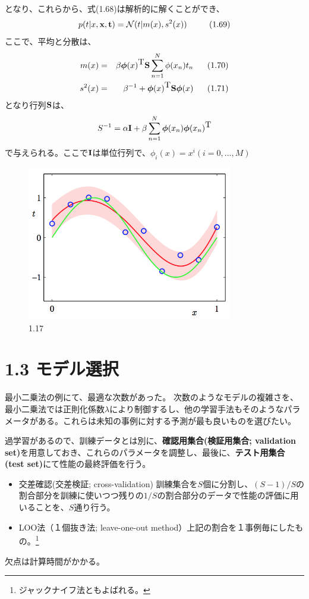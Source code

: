 \documentclass{jsarticle}
\def\N{{\mathcal{N}}}
\def\p{{\bm{\phi}}}
\def\t{{\mbox{\bf t}}}
\def\x{{\mbox{\bf x}}}
\def\T{{\mbox{T}}}
\def\S{{\mbox{\bf S}}}
\def\I{{\mbox{\bf I}}}
\begin{document}
となり、これらから、式(1.68)は解析的に解くことができ、
\[
p(t|x,\x,\t) = \N(t|m(x),s^2(x))  \ \ \ \ \ \ \ \ (1.69)
\]
ここで、平均と分散は、
\begin{eqnarray*}
  m(x) & = &\beta\p(x)^{\T}\S\sum_{n=1}^{N}\phi(x_n)t_n \ \ \ \ \ (1.70) \\
  s^2(x) & = & \beta^{-1} + \p(x)^{\T}\S\p(x) \ \ \ \ \ (1.71)
\end{eqnarray*}
となり行列$\S$は、
\begin{eqnarray*}
  S^{-1} = \alpha\I+\beta\sum_{n=1}^{N}\p(x_n)\p(x_n)^\T
\end{eqnarray*}
で与えられる。ここで$\I$は単位行列で、$\phi_i(x) = x^i (i=0,...,M)$

\begin{figure}
  \centering
  \includegraphics[width=0.8\textwidth]{f1-17.png}
  \caption{1.17}
\end{figure}

\section*{1.3 モデル選択}

最小二乗法の例にて、最適な次数があった。
次数のようなモデルの複雑さを、最小二乗法では正則化係数$\lambda$により制御するし、他の学習手法もそのようなパラメータがある。これらは未知の事例に対する予測が最も良いものを選びたい。

過学習があるので、訓練データとは別に、{\bf 確認用集合(検証用集合; validation set)}を用意しておき、これらのパラメータを調整し、最後に、{\bf テスト用集合(test set)}にて性能の最終評価を行う。

\begin{itemize}
\item 交差確認(交差検証; cross-validation) 訓練集合を$S$個に分割し、$(S-1)/S$の割合部分を訓練に使いつつ残りの$1/S$の割合部分のデータで性能の評価に用いることを、$S$通り行う。
\item LOO法（１個抜き法; leave-one-out method）上記の割合を１事例毎にしたもの。\footnote{ジャックナイフ法ともよばれる。}
\end{itemize}
欠点は計算時間がかかる。
\end{document}
